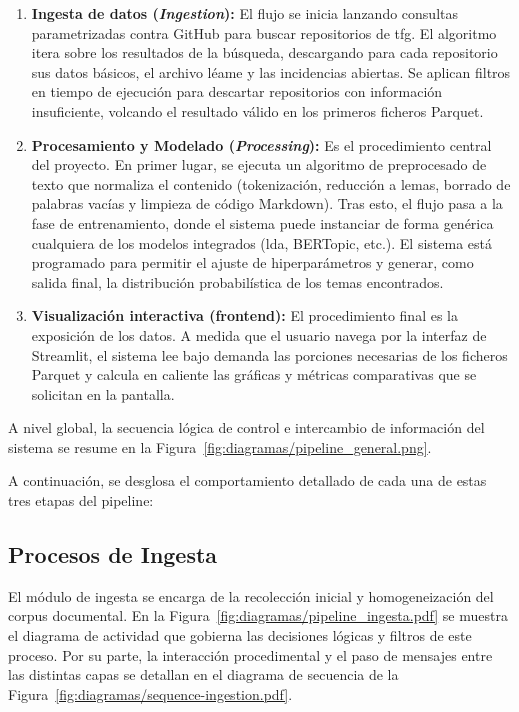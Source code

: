 \begin{enumerate}
    \item \textbf{Ingesta de datos (\textit{Ingestion}):} El flujo se inicia lanzando consultas parametrizadas contra GitHub para buscar repositorios de \acrshort{tfg}. El algoritmo itera sobre los resultados de la búsqueda, descargando para cada repositorio sus datos básicos, el archivo léame y las incidencias abiertas. Se aplican filtros en tiempo de ejecución para descartar repositorios con información insuficiente, volcando el resultado válido en los primeros ficheros Parquet.
    \item \textbf{Procesamiento y Modelado (\textit{Processing}):} Es el procedimiento central del proyecto. En primer lugar, se ejecuta un algoritmo de preprocesado de texto que normaliza el contenido (tokenización, reducción a lemas, borrado de palabras vacías y limpieza de código Markdown). Tras esto, el flujo pasa a la fase de entrenamiento, donde el sistema puede instanciar de forma genérica cualquiera de los modelos integrados (\acrshort{lda}, BERTopic, etc.). El sistema está programado para permitir el ajuste de hiperparámetros y generar, como salida final, la distribución probabilística de los temas encontrados.
    \item \textbf{Visualización interactiva (frontend):} El procedimiento final es la exposición de los datos. A medida que el usuario navega por la interfaz de Streamlit, el sistema lee bajo demanda las porciones necesarias de los ficheros Parquet y calcula en caliente las gráficas y métricas comparativas que se solicitan en la pantalla.
\end{enumerate}

A nivel global, la secuencia lógica de control e intercambio de información del
sistema se resume en la Figura~\ref{fig:diagramas/pipeline_general.png}.


A continuación, se desglosa el comportamiento detallado de cada una de estas
tres etapas del pipeline:

\subsection{Procesos de Ingesta}

El módulo de ingesta se encarga de la recolección inicial y homogeneización del
corpus documental. En la Figura~\ref{fig:diagramas/pipeline_ingesta.pdf} se
muestra el diagrama de actividad que gobierna las decisiones lógicas y filtros
de este proceso. Por su parte, la interacción procedimental y el paso de
mensajes entre las distintas capas se detallan en el diagrama de secuencia de
la Figura~\ref{fig:diagramas/sequence-ingestion.pdf}.

